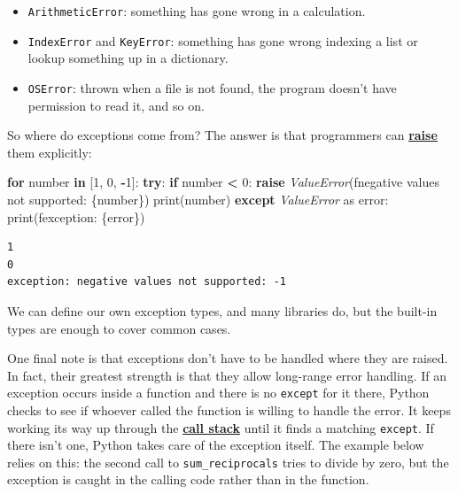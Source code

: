 \documentclass[
]{krantz}
\makeatletter
\newenvironment{Shaded}{\begin{snugshade}}{\end{snugshade}}
\newcommand{\BuiltInTok}[1]{#1}
\newcommand{\ControlFlowTok}[1]{\textcolor[rgb]{0.13,0.29,0.53}{\textbf{#1}}}
\newcommand{\DecValTok}[1]{\textcolor[rgb]{0.00,0.00,0.81}{#1}}
\newcommand{\ImportTok}[1]{#1}
\newcommand{\KeywordTok}[1]{\textcolor[rgb]{0.13,0.29,0.53}{\textbf{#1}}}
\newcommand{\NormalTok}[1]{#1}
\newcommand{\OperatorTok}[1]{\textcolor[rgb]{0.81,0.36,0.00}{\textbf{#1}}}
\newcommand{\PreprocessorTok}[1]{\textcolor[rgb]{0.56,0.35,0.01}{\textit{#1}}}
\newcommand{\SpecialCharTok}[1]{\textcolor[rgb]{0.00,0.00,0.00}{#1}}
\newcommand{\SpecialStringTok}[1]{\textcolor[rgb]{0.31,0.60,0.02}{#1}}
\providecommand{\tightlist}{%
  \setlength{\itemsep}{0pt}\setlength{\parskip}{0pt}}
\newenvironment{kframe}{%
\medskip{}
\setlength{\fboxsep}{.8em}
 \def\at@end@of@kframe{}%
 \ifinner\ifhmode%
  \def\at@end@of@kframe{\end{minipage}}%
  \begin{minipage}{\columnwidth}%
 \fi\fi%
 \def\FrameCommand##1{\hskip\@totalleftmargin \hskip-\fboxsep
 \colorbox{shadecolor}{##1}\hskip-\fboxsep
     \hskip-\linewidth \hskip-\@totalleftmargin \hskip\columnwidth}%
 \MakeFramed {\advance\hsize-\width
   \@totalleftmargin\z@ \linewidth\hsize
   \@setminipage}}%
 {\par\unskip\endMakeFramed%
 \at@end@of@kframe}
\renewenvironment{Shaded}{\begin{kframe}}{\end{kframe}}
\newcommand{\gref}[2]{\hyperlink{#2}{\textbf{#1}}}
\makeatother
\begin{document}
\begin{itemize}
\tightlist
\item
  \texttt{ArithmeticError}:
  something has gone wrong in a calculation.
\item
  \texttt{IndexError} and \texttt{KeyError}:
  something has gone wrong indexing a list or lookup something up in a dictionary.
\item
  \texttt{OSError}:
  thrown when a file is not found,
  the program doesn't have permission to read it,
  and so on.
\end{itemize}

So where do exceptions come from?
The answer is that programmers can \gref{raise}{raise\_exception} them explicitly:

\begin{Shaded}
\begin{Highlighting}[]
\ControlFlowTok{for}\NormalTok{ number }\KeywordTok{in}\NormalTok{ [}\DecValTok{1}\NormalTok{, }\DecValTok{0}\NormalTok{, }\OperatorTok{{-}}\DecValTok{1}\NormalTok{]:}
    \ControlFlowTok{try}\NormalTok{:}
        \ControlFlowTok{if}\NormalTok{ number }\OperatorTok{\textless{}} \DecValTok{0}\NormalTok{:}
            \ControlFlowTok{raise} \PreprocessorTok{ValueError}\NormalTok{(}\SpecialStringTok{f\textquotesingle{}negative values not supported: }\SpecialCharTok{\{}\NormalTok{number}\SpecialCharTok{\}}\SpecialStringTok{\textquotesingle{}}\NormalTok{)}
        \BuiltInTok{print}\NormalTok{(number)}
    \ControlFlowTok{except} \PreprocessorTok{ValueError} \ImportTok{as}\NormalTok{ error:}
        \BuiltInTok{print}\NormalTok{(}\SpecialStringTok{f\textquotesingle{}exception: }\SpecialCharTok{\{}\NormalTok{error}\SpecialCharTok{\}}\SpecialStringTok{\textquotesingle{}}\NormalTok{)}
\end{Highlighting}
\end{Shaded}

\begin{verbatim}
1
0
exception: negative values not supported: -1
\end{verbatim}

We can define our own exception types,
and many libraries do,
but the built-in types are enough to cover common cases.

One final note is that exceptions don't have to be handled where they are raised.
In fact,
their greatest strength is that they allow long-range error handling.
If an exception occurs inside a function and there is no \texttt{except} for it there,
Python checks to see if whoever called the function is willing to handle the error.
It keeps working its way up through the \gref{call stack}{call\_stack}
until it finds a matching \texttt{except}.
If there isn't one,
Python takes care of the exception itself.
The example below relies on this:
the second call to \texttt{sum\_reciprocals} tries to divide by zero,
but the exception is caught in the calling code
rather than in the function.
\end{document}
